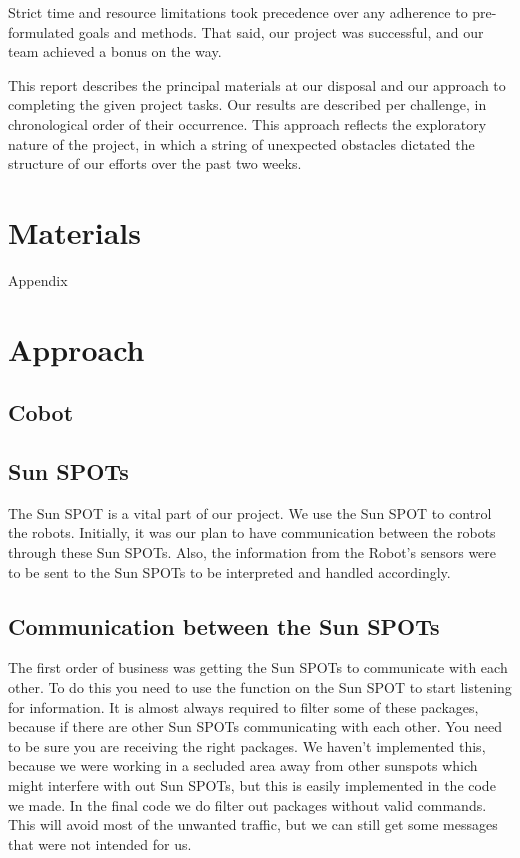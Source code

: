 \documentclass[a4paper,10pt]{article} %
\begin{document}
Strict time and resource limitations took precedence over any adherence
to pre-formulated goals and methods. That said, our project was successful,
and our team achieved a bonus on the way.

This report describes the principal materials at our disposal and our approach
to completing the given project tasks. Our results are described per challenge,
in chronological order of their occurrence. This approach reflects the
exploratory nature of the project, in which a string of unexpected obstacles
dictated the structure of our efforts over the past two weeks.


\section{Materials} %

Appendix



\section{Approach} %

\subsection{Cobot} %


\subsection{Sun SPOTs} %
\label{sec:sunspot}

The Sun SPOT is a vital part of our project. We use the Sun SPOT to control the
robots. Initially, it was our plan to have communication between the robots
through these Sun SPOTs. Also, the information from the Robot's sensors were to
be sent to the Sun SPOTs to be interpreted and handled accordingly.


\subsection{Communication between the Sun SPOTs} %
\label{subsec:comm}

The first order of business was getting the Sun SPOTs to communicate with each
other. To do this you need to use the function on the Sun SPOT to start
listening for information. It is almost always required to filter some of these
packages, because if there are other Sun SPOTs communicating with each other.
You need to be sure you are receiving the right packages. We haven't implemented
this, because we were working in a secluded area away from other sunspots which
might interfere with out Sun SPOTs, but this is easily implemented in the code
we made. In the final code we do filter out packages without valid commands.
This will avoid most of the unwanted traffic, but we can still get some messages
that were not intended for us.
\end{document}
